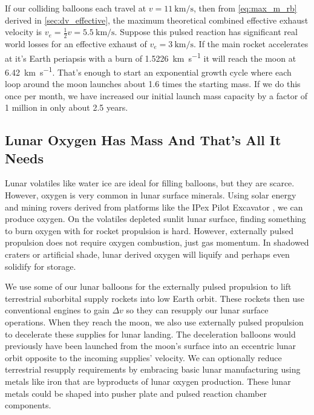 \documentclass{article}
\begin{document}
{If our colliding balloons each travel at $v=\SI{11}{\kilo\meter\per\second}$, then from \autoref{eq:max_m_rb} derived in \autoref{sec:dv_effective},  the maximum theoretical combined effective exhaust velocity is $v_e = \frac{1}{2}v = \SI {5.5}{\kilo\meter\per\second}$.  Suppose this pulsed reaction has significant real world losses for an effective exhaust of $v_e = \SI{3}{\kilo\meter\per\second}$.   If the main rocket accelerates at it's Earth periapsis with a burn of \SI{1.5226}{\kilo\meter\per\second} it will reach the moon at \SI{6.42}{\kilo\meter\per\second}.   That's enough to start an exponential growth cycle where each loop around the moon launches about 1.6 times the starting mass.   If we do this once per month, we have increased our initial launch mass capacity by a factor of 1 million in only about 2.5 years. 

\subsection{Lunar Oxygen Has Mass And That's All It Needs}\label{sec:lunar_mining}
Lunar volatiles like water ice are ideal for filling balloons, but they are scarce.   However, oxygen is very common in lunar surface minerals.   Using solar energy and mining rovers derived from platforms like the IPex Pilot Excavator \cite{ipex_pilot_excavator}, we can produce oxygen.  On the volatiles depleted sunlit lunar surface, finding something to burn oxygen with for rocket propulsion is hard.   However, externally pulsed propulsion does not require oxygen combustion, just gas momentum.  In shadowed craters or artificial shade, lunar derived oxygen will liquify and perhaps even solidify for storage.  

We use some of our lunar balloons for the externally pulsed propulsion to lift terrestrial suborbital supply rockets into low Earth orbit.  These rockets then use conventional engines to gain \(\Delta v\) so they can resupply our lunar surface operations.   When they reach the moon, we also use externally pulsed propulsion to decelerate these supplies for lunar landing.  The deceleration balloons would previously have been launched from the moon's surface into an eccentric lunar orbit opposite to the incoming supplies' velocity.   We can optionally reduce terrestrial resupply requirements by embracing basic lunar manufacturing using metals like iron that are byproducts of lunar oxygen production.  These lunar metals could be shaped into pusher plate and pulsed reaction chamber components.  

}
\end{document}
